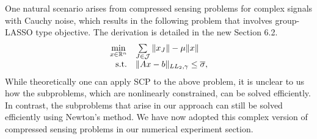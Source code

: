\documentclass{article}
\def\R{\mathbb{R}}
\begin{document}
\begin{enumerate}
One natural scenario arises from compressed sensing problems for complex signals with Cauchy noise, which results in the following problem that involves group-LASSO type objective. The derivation is detailed in the new Section 6.2.
\begin{equation}\label{E2}
  \begin{array}{rl}
    \min\limits_{x\in\R^n} & \sum\limits_{J\in\mathcal{J}}\|x_J\| - \mu\|x\| \\
    {\rm s.t.} & \|Ax - b\|_{LL_2,\gamma}\leq \overline{\sigma},
  \end{array}
\end{equation}
While theoretically one can apply SCP to the above problem, it is unclear to us how the subproblems, which are nonlinearly constrained, can be solved efficiently. In contrast, the subproblems that arise in our approach can still be solved efficiently using Newton's method. We have now adopted this complex version of compressed sensing problems in our numerical experiment section. 
%

\end{enumerate}
\end{document}
